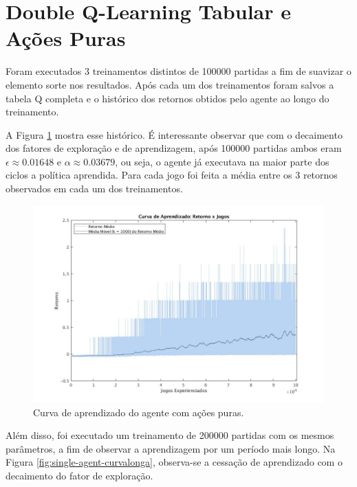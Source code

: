 \section{Double Q-Learning Tabular e Ações Puras}

Foram executados 3 treinamentos distintos de 100000 partidas a fim de suavizar o elemento sorte nos resultados. Após cada um dos treinamentos foram salvos a tabela Q completa e o histórico dos retornos obtidos pelo agente ao longo do treinamento.

A Figura \ref{fig:single-agent-curva} mostra esse histórico. É interessante observar que com o decaimento dos fatores de exploração e de aprendizagem, após 100000 partidas ambos eram $\epsilon \approx 0.01648$ e $\alpha \approx 0.03679$, ou seja, o agente já executava na maior parte dos ciclos a política aprendida. Para cada jogo foi feita a média entre os 3 retornos observados em cada um dos treinamentos.

\begin{figure}[h]
	\includegraphics[width=0.9\linewidth]{figs/curva-qtabular.jpg}
	\centering
	\caption{Curva de aprendizado do agente com ações puras. }
	\label{fig:single-agent-curva}
\end{figure}

Além disso, foi executado um treinamento de 200000 partidas com os mesmos parâmetros, a fim de observar a aprendizagem por um período mais longo. Na Figura \ref{fig:single-agent-curvalonga}, observa-se a cessação de aprendizado com o decaimento do fator de exploração.

